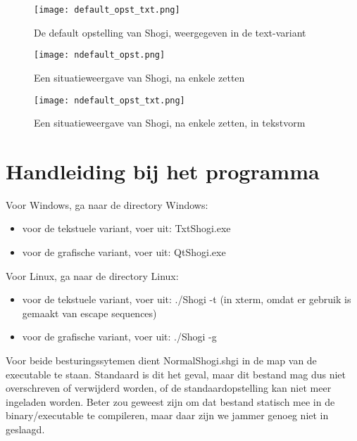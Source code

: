 \documentclass[a4paper,11pt,oneside, titlepage]{article}
\begin{document}
\begin{figure}[hbp]
\center
\texttt{[image: default\_opst\_txt.png]}
\caption{De default opstelling van Shogi, weergegeven in de text-variant}
\end{figure}
\clearpage

\begin{figure}[hbp]
\texttt{[image: ndefault\_opst.png]}
\caption{Een situatieweergave van Shogi, na enkele zetten}
\end{figure}
\clearpage

\begin{figure}[hbp]
\center
\texttt{[image: ndefault\_opst\_txt.png]}
\caption{Een situatieweergave van Shogi, na enkele zetten, in tekstvorm}
\end{figure}
\clearpage

\section{Handleiding bij het programma}
Voor Windows, ga naar de directory Windows:
	\begin{itemize}
		\item voor de tekstuele variant, voer uit: TxtShogi.exe
		\item voor de grafische variant, voer uit: QtShogi.exe
	 \end{itemize} 
Voor Linux, ga naar de directory Linux:
	\begin{itemize}
		\item voor de tekstuele variant, voer uit: ./Shogi -t (in xterm, omdat er gebruik is gemaakt van escape sequences)
		\item voor de grafische variant, voer uit: ./Shogi -g
	 \end{itemize}
Voor beide besturingssytemen dient NormalShogi.shgi in de map van de executable te staan. Standaard is dit het geval, maar dit bestand mag dus niet overschreven of verwijderd worden, of de standaardopstelling kan niet meer ingeladen worden. Beter zou geweest zijn om dat bestand statisch mee in de binary/executable te compileren, maar daar zijn we jammer genoeg niet in geslaagd.
\end{document}
